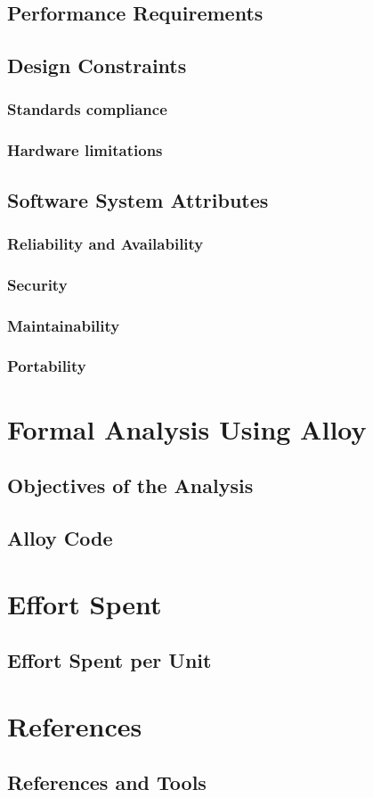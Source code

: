 \documentclass{article}
\begin{document}
\subsection{Performance Requirements}
\subsection{Design Constraints}
\subsubsection{Standards compliance}
\subsubsection{Hardware limitations}
\subsection{Software System Attributes}
\subsubsection{Reliability and Availability}
\subsubsection{Security}
\subsubsection{Maintainability}
\subsubsection{Portability}

\section{Formal Analysis Using Alloy}
\subsection{Objectives of the Analysis}
\subsection{Alloy Code}

\section{Effort Spent}
\subsection{Effort Spent per Unit}

\section{References}
\subsection{References and Tools}

\maketitle
\end{document}
